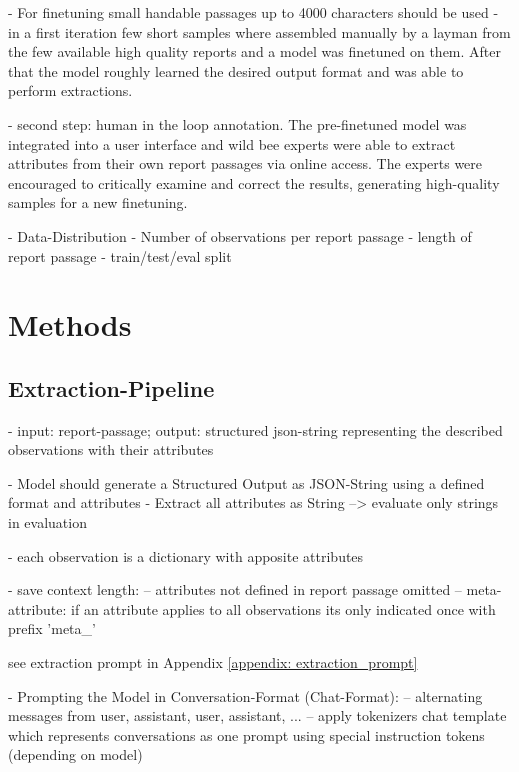 \documentclass{article}
\begin{document}
- For finetuning small handable passages up to 4000 characters should be used
- in a first iteration few short samples where assembled manually by a layman from the few available high quality reports and a model was finetuned on them. After that the model roughly learned the desired output format and was able to perform extractions.

- second step: human in the loop annotation. The pre-finetuned model was integrated into a user interface and wild bee experts were able to extract attributes from their own report passages via online access. The experts were encouraged to critically examine and correct the results, generating high-quality samples for a new finetuning.

- Data-Distribution
    - Number of observations per report passage
    - length of report passage
    - train/test/eval split


\section{ Methods }



\subsection{Extraction-Pipeline}
- input: report-passage; output: structured json-string representing the described observations with their attributes



- Model should generate a Structured Output as JSON-String using a defined format and attributes
- Extract all attributes as String --> evaluate only strings in evaluation

- each observation is a dictionary with apposite attributes

- save context length:
-- attributes not defined in report passage omitted
-- meta-attribute: if an attribute applies to all observations its only indicated once with prefix 'meta\_' 

see extraction prompt in Appendix \ref{appendix: extraction_prompt}


- Prompting the Model in Conversation-Format (Chat-Format):
-- alternating messages from user, assistant, user, assistant, ... 
-- apply tokenizers chat template which represents conversations as one prompt using special instruction tokens (depending on model)
\end{document}
